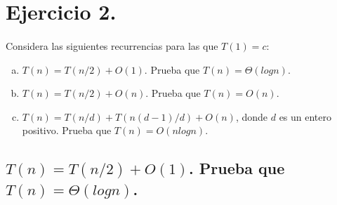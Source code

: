 \documentclass[12pt]{article}
\begin{document}
\section{Ejercicio 2.}
\paragraph{} Considera las siguientes recurrencias para las que $T(1)=c$:
\begin{enumerate}[a)]
\item $T(n)=T(n/2) + O(1)$. Prueba que $T(n)=\Theta(logn)$.
\item $T(n)=T(n/2) + O(n)$. Prueba que $T(n)=O(n)$.
\item $T(n)=T(n/d) + T(n(d-1)/d) + O(n)$, donde $d$ es un entero positivo. Prueba que $T(n)=O(nlogn)$.
\end{enumerate}
\subsection{$T(n)=T(n/2) + O(1)$. Prueba que $T(n)=\Theta(logn)$.}
\end{document}
